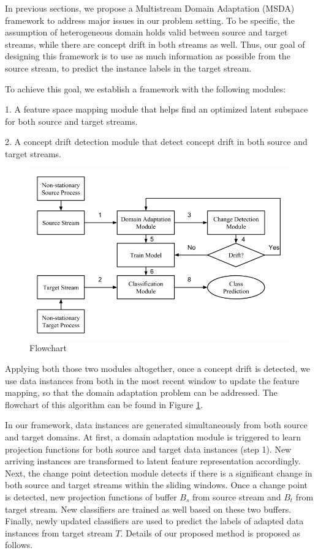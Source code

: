 In previous sections, we propose a Multistream Domain Adaptation (MSDA) framework to address major issues in our problem setting. 
To be specific, the assumption of heterogeneous domain holds valid between source and target streams,
while there are concept drift in both streams as well. Thus, our goal of designing this framework is to use as much information as possible from the source stream,
to predict the instance labels in the target stream.

To achieve this goal, we establish a framework with the following modules:

1. A feature space mapping module that helps find an optimized latent subspace for both source and target streams. 

2. A concept drift detection module that detect concept drift in both source and target streams.

\begin{figure}[t]
\centering
\includegraphics[width=1.0\columnwidth]{Figures/flowchart.png}
\caption{Flowchart}
\label{fig:flowchart}
\end{figure}

Applying both those two modules altogether, once a concept drift is detected, we use data instances from both in the most recent window to update the feature mapping, so that the domain adaptation problem can be addressed. The flowchart of this algorithm can be found in Figure \ref{fig:flowchart}.

In our framework, data instances are generated simultaneously from both source and target domains. 
At first, a domain adaptation module is triggered to learn projection functions for both source and target data instances (step 1). 
New arriving instances are transformed to latent feature representation accordingly. Next, the change point detection module detects if there is a significant change in both source and target streams within the sliding windows. 
Once a change point is detected, new projection functions of buffer $B_s$ from source stream and $B_t$ from target stream. 
New classifiers are trained as well based on these two buffers. Finally, newly updated classifiers are used to  predict the labels of adapted data instances from target stream $T$. Details of our proposed method is proposed as follows.

